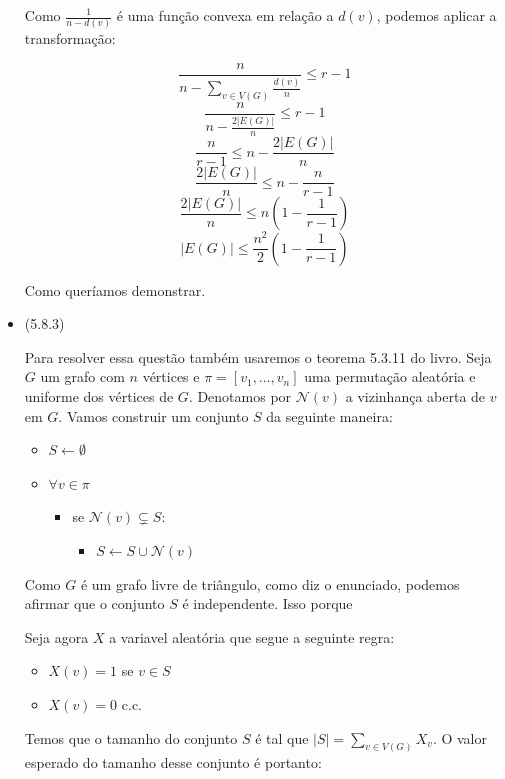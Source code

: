\documentclass{article}
\begin{document}
\begin{itemize}
	      Como \(\frac{1}{n - d(v)}\) é uma função convexa em relação a \(d(v)\), podemos aplicar a transformação:

	      \[\frac{n}{n - \sum_{v \in V(G)} \frac{d(v)}{n}} \leq r - 1\]
	      \[\frac{n}{n - \frac{2 |E(G)|}{n}} \leq r - 1\]
	      \[\frac{n}{r - 1} \leq n - \frac{2 |E(G)|}{n}\]
	      \[\frac{2 |E(G)|}{n} \leq n - \frac{n}{r - 1}\]
	      \[\frac{2 |E(G)|}{n} \leq n (1 - \frac{1}{r - 1})\]
	      \[|E(G)| \leq \frac{n^2}{2} (1 - \frac{1}{r - 1})\]

	      Como queríamos demonstrar.

	\item (5.8.3)

	      Para resolver essa questão também usaremos o teorema 5.3.11 do livro. Seja \(G\) um grafo com \(n\) vértices e \(\pi = [v_1, \dots, v_{n}]\) uma permutação
	      aleatória e uniforme dos vértices de \(G\). Denotamos por \(\mathcal{N}(v)\) a vizinhança aberta de \(v\) em \(G\). Vamos construir um conjunto \(S\) da seguinte maneira:

	      \begin{itemize}
		      \item \(S \gets \emptyset\)
		      \item \(\forall v \in \pi\)
		            \begin{itemize}
			            \item se \(\mathcal{N}(v) \subsetneq S\):
			                  \begin{itemize}
				                  \item \(S \gets S \cup \mathcal{N}(v)\)
			                  \end{itemize}
		            \end{itemize}
	      \end{itemize}

	      Como \(G\) é um grafo livre de triângulo, como diz o enunciado, podemos afirmar que o conjunto \(S\) é independente. Isso porque

	      Seja agora \(X\) a variavel aleatória que segue a seguinte regra:

	      \begin{itemize}
		      \item \(X(v) = 1\) se \(v \in S\)
		      \item \(X(v) = 0\) c.c.
	      \end{itemize}

	      Temos que o tamanho do conjunto \(S\) é tal que \(|S| = \sum_{v \in V(G)} X_v\). O valor esperado do tamanho desse conjunto é portanto:


\end{itemize}
\end{document}
